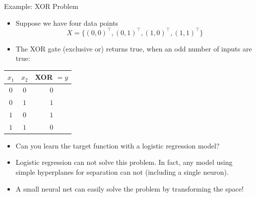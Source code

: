 \documentclass[11pt,compress,t,notes=noshow, xcolor=table]{beamer}
\date{}
\begin{document}


\begin{vbframe}{Example: XOR Problem}
  \begin{itemize}
    \item Suppose we have four data points $$X = \{(0,0)^\top, (0,1)^\top, (1,0)^\top, (1,1)^\top \}$$
    \item The XOR gate (exclusive or) returns true, when an odd number of inputs are true:
  \end{itemize}
  \begin{table}
    \centering
      \begin{tabular}{ccc}
        \textbf{$x_1$}  & \textbf{$x_2$}  & \textbf{XOR} $= y$ \\
        \hline
        \hline
        $0$             &   $0$           &  $0$ \\
        $0$             &   $1$           &  $1$ \\
        $1$             &   $0$           &  $1$ \\
        $1$             &   $1$           &  $0$
      \end{tabular}
  \end{table}
  \begin{itemize}
    \item Can you learn the target function with a logistic regression model? \\
  \end{itemize}
\framebreak
  \begin{minipage}{0.45\textwidth}
    \begin{itemize}
      \item Logistic regression can not solve this problem. %
      In fact, any model using simple hyperplanes for separation can not (including a single neuron).
      \lz
      \item A small neural net can easily solve the problem by transforming the space!
    \end{itemize}

\end{minipage}
\end{vbframe}
\end{document}
